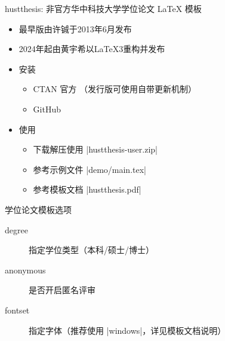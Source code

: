 \begin{frame}{hustthesis: 非官方华中科技大学学位论文 \LaTeX{} 模板}
  \begin{itemize}
  \item 最早\LaTeXe{}版由许铖于2013年6月发布
  \item 2024年起由黄宇希以\LaTeX3重构并发布\pause

  \item 安装
    \begin{itemize}
      \item CTAN 官方 （发行版可使用自带更新机制）
      \item GitHub \link[\faGithub\thesisgithubpath]{\thesisgithublink}
    \end{itemize} \pause

  \item 使用
    \begin{itemize}
      \item 下载解压使用 |hustthesis-user.zip| 
      \item 参考示例文件 |demo/main.tex| 
      \item 参考模板文档 |hustthesis.pdf| 
    \end{itemize}
  \end{itemize}
\end{frame}

\begin{frame}[fragile]{学位论文模板选项}
  \begin{description}
  \item[degree] 指定学位类型（本科/硕士/博士）
  \item[anonymous] 是否开启匿名评审
  \item[fontset] 指定字体（推荐使用 |windows|，详见模板文档说明）
  \end{description}
\end{frame}

